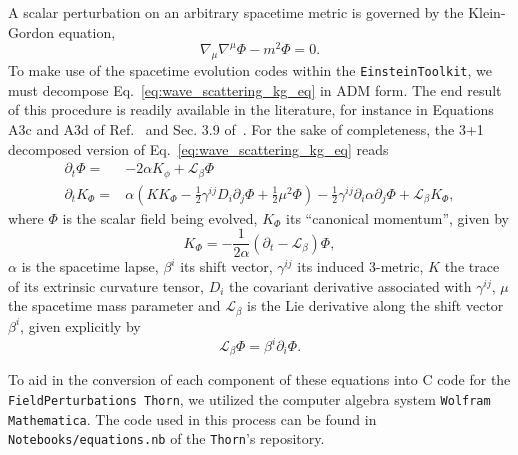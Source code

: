 A scalar perturbation on an arbitrary spacetime metric is governed by the Klein-Gordon equation,
%
\begin{equation}
  \nabla_\mu \nabla^\mu \Phi - m^2 \Phi = 0.
  \label{eq:wave_scattering_kg_eq}
\end{equation}
%
To make use of the spacetime evolution codes within the \texttt{EinsteinToolkit}, we must decompose Eq.~\eqref{eq:wave_scattering_kg_eq} in ADM form. The end result of this procedure is readily available in the literature, for instance in Equations A3c and A3d of Ref.~\cite{PhysRevD.96.104040} and Sec. 3.9 of~\cite{Ficarra2023}. For the sake of completeness, the 3+1 decomposed version of Eq.~\eqref{eq:wave_scattering_kg_eq} reads
%
\begin{align}
  \partial_t \Phi =   & -2 \alpha K_\phi + \mathcal{L}_\beta \Phi \label{eq:wave_scattering_a3c}                                                                                                                                                     \\
  \partial_t K_\Phi = & \alpha \left( K K_\Phi - \frac{1}{2} \gamma^{ij} D_i \partial_j \Phi + \frac{1}{2} \mu^2 \Phi \right) - \frac{1}{2} \gamma^{ij} \partial_i \alpha \partial_j \Phi + \mathcal{L}_\beta K_\Phi, \label{eq:wave_scattering_a3d}
\end{align}
%
where $\Phi$ is the scalar field being evolved, $K_\Phi$ its ``canonical momentum'', given by
%
\begin{equation}
  K_\Phi = -\frac{1}{2\alpha} \left( \partial_t - \mathcal{L}_\beta \right)\Phi,
  \label{eq:wave_scattering_a2}
\end{equation}
%
$\alpha$ is the spacetime lapse, $\beta^i$ its shift vector, $\gamma^{ij}$ its induced 3-metric, $K$ the trace of its extrinsic curvature tensor, $D_i$ the covariant derivative associated with $\gamma^{ij}$, $\mu$ the spacetime mass parameter and $\mathcal{L}_\beta$ is the Lie derivative along the shift vector $\beta^i$, given explicitly by
%
\begin{equation}
  \mathcal{L}_\beta\Phi = \beta^i \partial_i \Phi.
  \label{eq:wave_scattering_lie_derivative}
\end{equation}

To aid in the conversion of each component of these equations into C code for the \texttt{FieldPerturbations Thorn}, we utilized the computer algebra system \texttt{Wolfram Mathematica}. The code used in this process can be found in \texttt{Notebooks/equations.nb} of the \texttt{Thorn}'s repository.